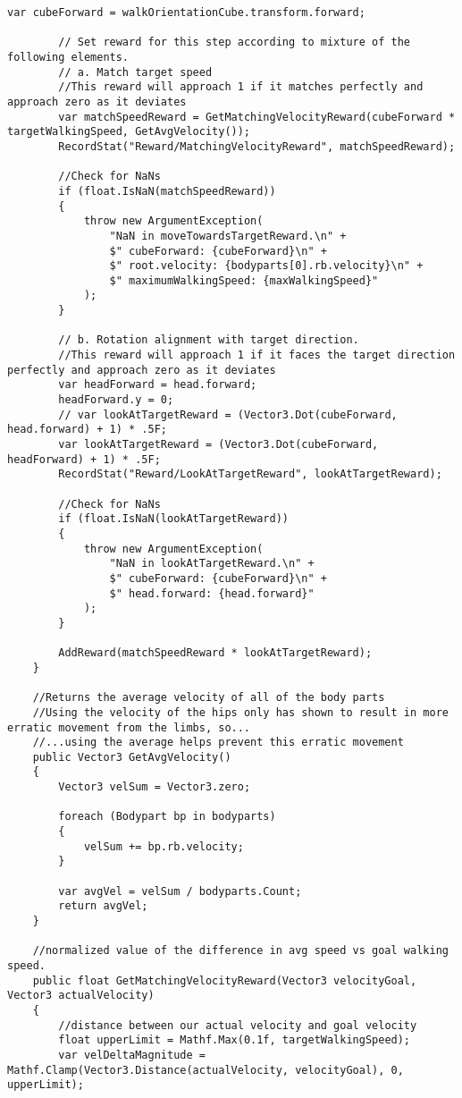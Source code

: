 \begin{lstlisting}[caption={Agenten Skript},captionpos=b,label={lst:skript_agent1}]
        var cubeForward = walkOrientationCube.transform.forward;

        // Set reward for this step according to mixture of the following elements.
        // a. Match target speed
        //This reward will approach 1 if it matches perfectly and approach zero as it deviates
        var matchSpeedReward = GetMatchingVelocityReward(cubeForward * targetWalkingSpeed, GetAvgVelocity());
        RecordStat("Reward/MatchingVelocityReward", matchSpeedReward);

        //Check for NaNs
        if (float.IsNaN(matchSpeedReward))
        {
            throw new ArgumentException(
                "NaN in moveTowardsTargetReward.\n" +
                $" cubeForward: {cubeForward}\n" +
                $" root.velocity: {bodyparts[0].rb.velocity}\n" +
                $" maximumWalkingSpeed: {maxWalkingSpeed}"
            );
        }

        // b. Rotation alignment with target direction.
        //This reward will approach 1 if it faces the target direction perfectly and approach zero as it deviates
        var headForward = head.forward;
        headForward.y = 0;
        // var lookAtTargetReward = (Vector3.Dot(cubeForward, head.forward) + 1) * .5F;
        var lookAtTargetReward = (Vector3.Dot(cubeForward, headForward) + 1) * .5F;
        RecordStat("Reward/LookAtTargetReward", lookAtTargetReward);

        //Check for NaNs
        if (float.IsNaN(lookAtTargetReward))
        {
            throw new ArgumentException(
                "NaN in lookAtTargetReward.\n" +
                $" cubeForward: {cubeForward}\n" +
                $" head.forward: {head.forward}"
            );
        }

        AddReward(matchSpeedReward * lookAtTargetReward);
    }

    //Returns the average velocity of all of the body parts
    //Using the velocity of the hips only has shown to result in more erratic movement from the limbs, so...
    //...using the average helps prevent this erratic movement
    public Vector3 GetAvgVelocity()
    {
        Vector3 velSum = Vector3.zero;

        foreach (Bodypart bp in bodyparts)
        {
            velSum += bp.rb.velocity;
        }

        var avgVel = velSum / bodyparts.Count;
        return avgVel;
    }

    //normalized value of the difference in avg speed vs goal walking speed.
    public float GetMatchingVelocityReward(Vector3 velocityGoal, Vector3 actualVelocity)
    {
        //distance between our actual velocity and goal velocity
        float upperLimit = Mathf.Max(0.1f, targetWalkingSpeed);
        var velDeltaMagnitude = Mathf.Clamp(Vector3.Distance(actualVelocity, velocityGoal), 0, upperLimit);


\end{lstlisting}
